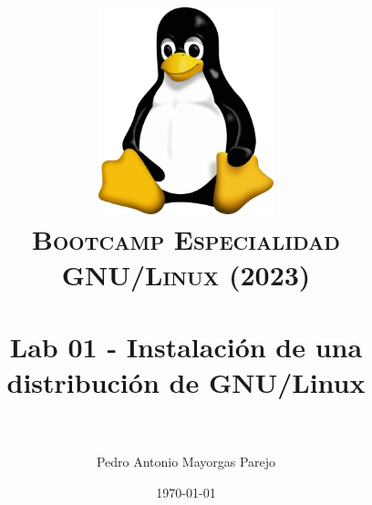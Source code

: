 

\graphicspath{ {img/} }

\title{
\normalfont \normalsize
\includegraphics[width=6cm,height=6cm]{logo}\\
\textsc{\textbf{Bootcamp Especialidad GNU/Linux (2023)}} \\ [25pt] %
\horrule{0.5pt} \\[0.4cm] %
\huge Lab 01 - Instalación de una distribución de GNU/Linux \\ %
\horrule{2pt} \\[0.5cm] %
}


\author{Pedro Antonio Mayorgas Parejo} %

\date{\normalsize\today} %




\maketitle %

\newpage %

\tableofcontents %

\newpage

